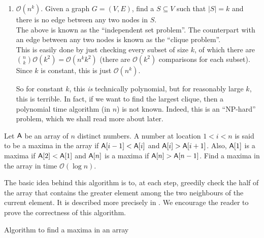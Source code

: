 \begin{enumerate}
	\item $\mathcal{O}(n^k)$. Given a graph $G=(V,E)$, find a $S\subseteq V$ such that $|S|=k$ and there is no edge between any two nodes in $S$.\\
	The above is known as the ``independent set problem''. The counterpart with an edge between any two nodes is known as the ``clique problem''.\\
	This is easily done by just checking every subset of size $k$, of which there are $\binom{n}{k}\mathcal{O}(k^2)=\mathcal{O}(n^k k^2)$ (there are $\mathcal{O}(k^2)$ comparisons for each subset). Since $k$ is constant, this is just $\mathcal{O}(n^k)$.

	So for constant $k$, this \textit{is} technically polynomial, but for reasonably large $k$, this is terrible. In fact, if we want to find the largest clique, then a polynomial time algorithm (in $n$) is not known. Indeed, this is an ``NP-hard'' problem, which we shall read more about later.

\end{enumerate}

\begin{exercise}
Let $\mathsf{A}$ be an array of $n$ distinct numbers. A number at location $1<i<n$ is said to be a maxima in the array if $\mathsf{A}[i-1]<\mathsf{A}[i]$ and $\mathsf{A}[i]>\mathsf{A}[i+1]$. Also, $\mathsf{A}[1]$ is a maxima if $\mathsf{A}[2]<\mathsf{A}[1]$ and $\mathsf{A}[n]$ is a maxima if $\mathsf{A}[n]>\mathsf{A}[n-1]$. Find a maxima in the array in time $\mathcal{O}(\log n)$.
\end{exercise}
\begin{solution*}
	The basic idea behind this algorithm is to, at each step, greedily check the half of the array that contains the greater element among the two neighbours of the current element. It is described more precisely in . We encourage the reader to prove the correctness of this algorithm.
\end{solution*}
	\begin{algorithm}
		\DontPrintSemicolon
		\caption{Algorithm to find a maxima in an array}\label{algo: find maxima}
	\end{algorithm}

